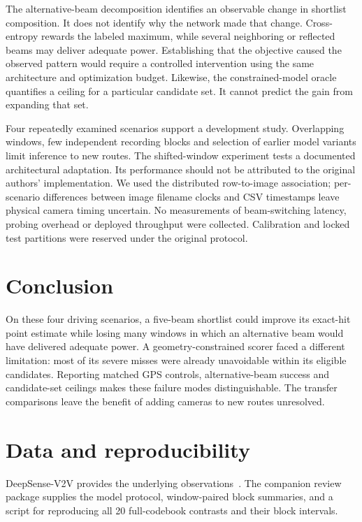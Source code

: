 \documentclass[10pt,journal,letterpaper]{IEEEtran}
\begin{document}
The alternative-beam decomposition identifies an observable change in shortlist composition. It does not identify why the network made that change. Cross-entropy rewards the labeled maximum, while several neighboring or reflected beams may deliver adequate power. Establishing that the objective caused the observed pattern would require a controlled intervention using the same architecture and optimization budget. Likewise, the constrained-model oracle quantifies a ceiling for a particular candidate set. It cannot predict the gain from expanding that set.

Four repeatedly examined scenarios support a development study. Overlapping windows, few independent recording blocks and selection of earlier model variants limit inference to new routes. The shifted-window experiment tests a documented architectural adaptation. Its performance should not be attributed to the original authors' implementation. We used the distributed row-to-image association; per-scenario differences between image filename clocks and CSV timestamps leave physical camera timing uncertain. No measurements of beam-switching latency, probing overhead or deployed throughput were collected. Calibration and locked test partitions were reserved under the original protocol.

\section{Conclusion}

On these four driving scenarios, a five-beam shortlist could improve its exact-hit point estimate while losing many windows in which an alternative beam would have delivered adequate power. A geometry-constrained scorer faced a different limitation: most of its severe misses were already unavoidable within its eligible candidates. Reporting matched GPS controls, alternative-beam success and candidate-set ceilings makes these failure modes distinguishable. The transfer comparisons leave the benefit of adding cameras to new routes unresolved.

\section{Data and reproducibility}

DeepSense-V2V provides the underlying observations~\cite{v2v,challenge}. The companion review package supplies the model protocol, window-paired block summaries, and a script for reproducing all 20 full-codebook contrasts and their block intervals.
\end{document}
